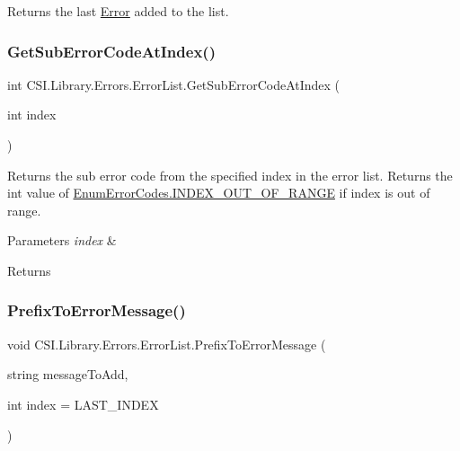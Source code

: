 Returns the last \mbox{\hyperlink{class_c_s_i_1_1_library_1_1_errors_1_1_error}{Error}} added to the list. 

\mbox{\label{class_c_s_i_1_1_library_1_1_errors_1_1_error_list_a30c56b5ef9bea09a590c28a772e282ea}} 
\subsubsection{\texorpdfstring{GetSubErrorCodeAtIndex()}{GetSubErrorCodeAtIndex()}}
{\footnotesize\ttfamily int C\+S\+I.\+Library.\+Errors.\+Error\+List.\+Get\+Sub\+Error\+Code\+At\+Index (\begin{DoxyParamCaption}\item[{int}]{index }\end{DoxyParamCaption})\hspace{0.3cm}{\ttfamily [inline]}}



Returns the sub error code from the specified index in the error list. Returns the int value of \mbox{\hyperlink{namespace_c_s_i_1_1_library_1_1_errors_a5534735de1ef2256eb4c52c7440e30d7a577cf42cc2eae1cffef0f749c6c08787}{Enum\+Error\+Codes.\+I\+N\+D\+E\+X\+\_\+\+O\+U\+T\+\_\+\+O\+F\+\_\+\+R\+A\+N\+GE}} if index is out of range. 


\begin{DoxyParams}{Parameters}
{\em index} & \\
\hline
\end{DoxyParams}
\begin{DoxyReturn}{Returns}

\end{DoxyReturn}
\mbox{\label{class_c_s_i_1_1_library_1_1_errors_1_1_error_list_a26df213cc94a946cb8c22749277b740c}} 
\subsubsection{\texorpdfstring{PrefixToErrorMessage()}{PrefixToErrorMessage()}}
{\footnotesize\ttfamily void C\+S\+I.\+Library.\+Errors.\+Error\+List.\+Prefix\+To\+Error\+Message (\begin{DoxyParamCaption}\item[{string}]{message\+To\+Add,  }\item[{int}]{index = {\ttfamily LAST\+\_\+INDEX} }\end{DoxyParamCaption})\hspace{0.3cm}{\ttfamily [inline]}}



